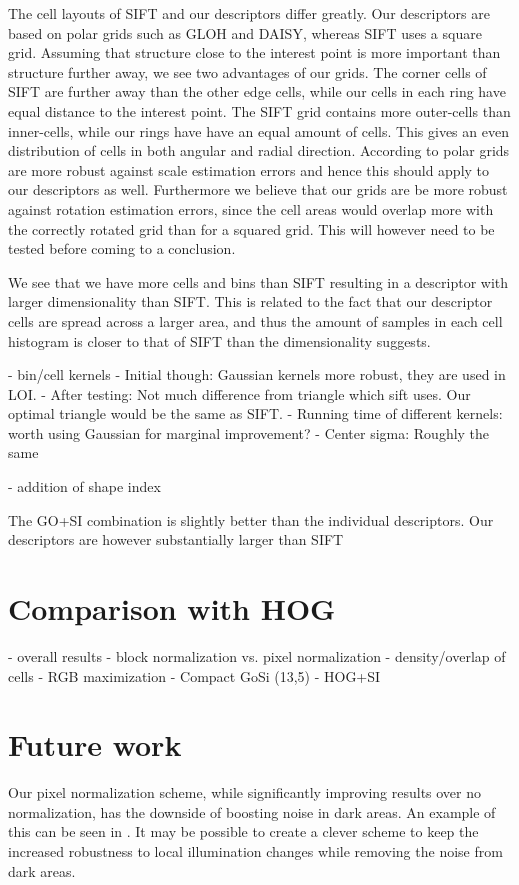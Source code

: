 \documentclass[thesis.tex]{subfiles}
\begin{document}
The cell layouts of SIFT and our descriptors differ greatly. Our descriptors are based on polar grids such as GLOH and DAISY, whereas SIFT uses a square grid. Assuming that structure close to the interest point is more important than structure further away, we see two advantages of our grids. The corner cells of SIFT are further away than the other edge cells, while our cells in each ring have equal distance to the interest point. The SIFT grid contains more outer-cells than inner-cells, while our rings have have an equal amount of cells. This gives an even distribution of cells in both angular and radial direction. According to \citet{cui2009scale} polar grids are more robust against scale estimation errors and hence this should apply to our descriptors as well. Furthermore we believe that our grids are be more robust against rotation estimation errors, since the cell areas would overlap more with the correctly rotated grid than for a squared grid. This will however need to be tested before coming to a conclusion.

We see that we have more cells and bins than SIFT resulting in a descriptor with larger dimensionality than SIFT. This is related to the fact that our descriptor cells are spread across a larger area, and thus the amount of samples in each cell histogram is closer to that of SIFT than the dimensionality suggests.

- bin/cell kernels
 - Initial though: Gaussian kernels more robust, they are used in LOI.
 - After testing: Not much difference from triangle which sift uses. Our optimal triangle would be the same as SIFT.
 - Running time of different kernels: worth using Gaussian for marginal improvement?
 - Center sigma: Roughly the same

- addition of shape index

The GO+SI combination is slightly better than the individual descriptors. Our descriptors are however substantially larger than SIFT

\section{Comparison with HOG}
- overall results
- block normalization vs. pixel normalization
- density/overlap of cells
- RGB maximization
- Compact GoSi (13,5)
- HOG+SI

\section{Future work} %
%
Our pixel normalization scheme, while significantly improving results over no normalization, has the downside of boosting noise in dark areas. An example of this can be seen in . It may be possible to create a clever scheme to keep the increased robustness to local illumination changes while removing the noise from dark areas.
\end{document}
